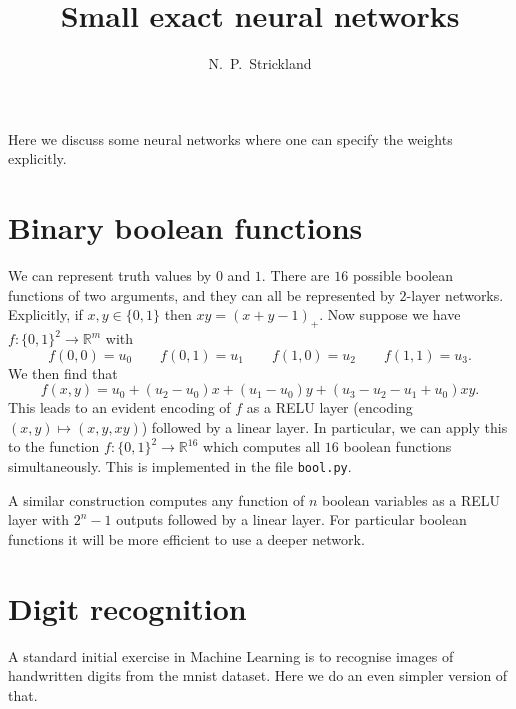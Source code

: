 \documentclass{amsart}
\newcommand{\R}         {{\mathbb{R}}}
\renewcommand{\:}{\colon}
\theoremstyle{definition}
\begin{document}
\title{Small exact neural networks}
\author{N.~P.~Strickland}

\maketitle 


Here we discuss some neural networks where one can specify the weights
explicitly. 

\section{Binary boolean functions}

We can represent truth values by $0$ and $1$.  There are $16$
possible boolean functions of two arguments, and they can all be
represented by $2$-layer networks.  Explicitly, if $x,y\in\{0,1\}$
then $xy=(x+y-1)_+$.  Now suppose we have $f\:\{0,1\}^2\to\R^m$ with 
\[ f(0,0) = u_0 \qquad f(0,1) = u_1 \qquad 
   f(1,0) = u_2 \qquad f(1,1) = u_3.
\]
We then find that 
\[ f(x,y) = u_0 + (u_2-u_0)x + (u_1-u_0)y + (u_3-u_2-u_1+u_0)xy. \]
This leads to an evident encoding of $f$ as a RELU layer (encoding
$(x,y)\mapsto(x,y,xy)$) followed by a linear layer.  In particular, we
can apply this to the function $f\:\{0,1\}^2\to\R^{16}$ which computes
all $16$ boolean functions simultaneously.  This is implemented in the
file \texttt{bool.py}.

A similar construction computes any function of $n$ boolean variables
as a RELU layer with $2^n-1$ outputs followed by a linear layer.  For
particular boolean functions it will be more efficient to use a deeper
network.  

\section{Digit recognition}

A standard initial exercise in Machine Learning is to recognise
images of handwritten digits from the mnist dataset.  Here we do an
even simpler version of that.
\end{document}
